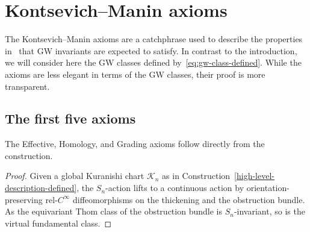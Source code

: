 \documentclass[AHL,Unicode,longabstracts]{cedram}
\makeatletter
\newcommand{\inp}[1]{\left\langle#1\right\rangle }
\newcommand{\lspan}[1]{\langle {#1}\rangle}
\newcommand{\vfcc}[1]{\left[#1\right]^{\virt}}
\newcommand{\fcll}[1]{\left[#1\right]}
\newcommand{\dul}{^\vee}
\newcommand{\Mbar}{\bar{\mathcal M}}
\newcommand{\bC}{\mathbb{C}}
\newcommand{\bE}{\mathbb{E}}
\newcommand{\bQ}{\mathbb{Q}}
\newcommand{\bZ}{\mathbb{Z}}
\newcommand{\cK}{\mathcal{K}}
\DeclareMathOperator{\virt}{vir}
\DeclareMathOperator{\Pt}{pt}
\let\save@mathaccent\mathaccent
\newcommand*\if@single[3]{%
  \setbox0\hbox{${\mathaccent"0362{#1}}^H$}%
  \setbox2\hbox{${\mathaccent"0362{\kern0pt#1}}^H$}%
  \ifdim\ht0=\ht2 #3\else #2\fi
  }
\newcommand*\rel@kern[1]{\kern#1\dimexpr\macc@kerna}
\newcommand*\widebar[1]{\@ifnextchar^{{\wide@bar{#1}{0}}}{\wide@bar{#1}{1}}}
\newcommand*\wide@bar[2]{\if@single{#1}{\wide@bar@{#1}{#2}{1}}{\wide@bar@{#1}{#2}{2}}}
\newcommand*\wide@bar@[3]{%
  \begingroup
  \def\mathaccent##1##2{%
    \let\mathaccent\save@mathaccent
    \if#32 \let\macc@nucleus\first@char \fi
    \setbox\z@\hbox{$\macc@style{\macc@nucleus}_{}$}%
    \setbox\tw@\hbox{$\macc@style{\macc@nucleus}{}_{}$}%
    \dimen@\wd\tw@
    \advance\dimen@-\wd\z@
    \divide\dimen@ 3
    \@tempdima\wd\tw@
    \advance\@tempdima-\scriptspace
    \divide\@tempdima 10
    \advance\dimen@-\@tempdima
    \ifdim\dimen@>\z@ \dimen@0pt\fi
    \rel@kern{0.6}\kern-\dimen@
    \if#31
      \overline{\rel@kern{-0.6}\kern\dimen@\macc@nucleus\rel@kern{0.4}\kern\dimen@}%
      \advance\dimen@0.4\dimexpr\macc@kerna
      \let\final@kern#2%
      \ifdim\dimen@<\z@ \let\final@kern1\fi
      \if\final@kern1 \kern-\dimen@\fi
    \else
      \overline{\rel@kern{-0.6}\kern\dimen@#1}%
    \fi
  }%
  \macc@depth\@ne
  \let\math@bgroup\@empty \let\math@egroup\macc@set@skewchar
  \mathsurround\z@ \frozen@everymath{\mathgroup\macc@group\relax}%
  \macc@set@skewchar\relax
  \let\mathaccentV\macc@nested@a
  \if#31
    \macc@nested@a\relax111{#1}%
  \else
    \def\gobble@till@marker##1\endmarker{}%
    \futurelet\first@char\gobble@till@marker#1\endmarker
    \ifcat\noexpand\first@char A\else
      \def\first@char{}%
    \fi
    \macc@nested@a\relax111{\first@char}%
  \fi
  \endgroup
}
\let\oldbar\bar
\renewcommand*{\bar}[1]{{\mathchoice{\widebar{#1}}{\widebar{#1}}{\widebar{#1}}{\oldbar{#1}}}}
\let\oldin\in
\renewcommand{\in}{\mathchoice{\oldin}{\oldin}{\,\oldin\,}{\,\oldin\,}}
\makeatother
\begin{document}
\section{Kontsevich--Manin axioms}\label{sec:axioms}

The Kontsevich--Manin axioms are a catchphrase used to describe the properties in~\cite{KM94} that GW invariants are expected to satisfy. In contrast to the introduction, we will consider here the GW classes defined by~\eqref{eq:gw-class-defined}. While the axioms are less elegant in terms of the GW classes, their proof is more transparent.


\subsection{The first five axioms}

The Effective, Homology, and Grading axioms follow directly from the construction.


\begin{proof}
Given a global Kuranishi chart $\cK_n$ as in Construction~\ref{high-level-description-defined}, the $S_n$-action lifts to a continuous action by orientation-preserving rel-$C^\infty$ diffeomorphisms on the thickening and the obstruction bundle. As the equivariant Thom class of the obstruction bundle is $S_n$-invariant, so is the virtual fundamental class.
\end{proof}

\end{document}

